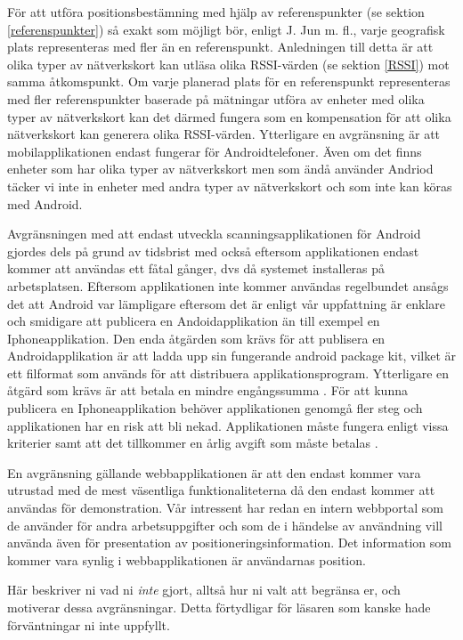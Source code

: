 \documentclass[swedish, a4paper,12pt]{article}
\begin{document}
För att utföra positionsbestämning med hjälp av referenspunkter (se sektion \ref{referenspunkter}) så exakt som möjligt bör, enligt J. Jun m. fl., varje geografisk plats representeras med fler än en referenspunkt\cite{jun2018low}.
Anledningen till detta är att olika typer av nätverkskort kan utläsa olika RSSI-värden (se sektion \ref{RSSI}) mot samma åtkomspunkt\cite{problem_with_RSSI}. Om varje planerad plats för en referenspunkt representeras med fler referenspunkter baserade på mätningar utföra av enheter med olika typer av nätverkskort kan det därmed fungera som en kompensation för att olika nätverkskort kan generera olika RSSI-värden\cite{jun2018low}.
Ytterligare en avgränsning är att mobilapplikationen endast fungerar för Androidtelefoner. Även om det finns enheter som har olika typer av nätverkskort men som ändå använder Andriod täcker vi inte in enheter med andra typer av nätverkskort och som inte kan köras med Android.

Avgränsningen med att endast utveckla scanningsapplikationen för Android gjordes dels på grund av tidsbrist med också eftersom applikationen endast kommer att användas ett fåtal gånger, dvs då systemet installeras på arbetsplatsen. Eftersom applikationen inte kommer användas regelbundet ansågs det att Android var lämpligare eftersom det är enligt vår uppfattning är enklare och smidigare att publicera en Andoidapplikation än till exempel en Iphoneapplikation. Den enda åtgärden som krävs för att publisera en Androidapplikation är att ladda upp sin fungerande android package kit, vilket är ett filformat som används för att distribuera applikationsprogram. Ytterligare en åtgärd som krävs är att betala en mindre engångssumma \cite{android} \cite{guidePublish}. För att kunna publicera en Iphoneapplikation behöver applikationen genomgå fler steg och applikationen har en risk att bli nekad. Applikationen måste fungera enligt vissa kriterier samt att det tillkommer en årlig avgift som måste betalas \cite{submitIphone} \cite{guidePublish}.

En avgränsning gällande webbapplikationen är att den endast kommer vara utrustad med de mest väsentliga funktionaliteterna då den endast kommer att användas för demonstration. Vår intressent har redan en intern webbportal som de använder för andra arbetsuppgifter och som de i händelse av användning vill använda även för presentation av positioneringsinformation. Det information som kommer vara synlig i webbapplikationen är användarnas position.

\iffalse Här beskriver ni vad ni \emph{inte} gjort, alltså hur ni valt att begränsa er, och motiverar dessa avgränsningar. Detta förtydligar för läsaren som kanske hade förväntningar ni inte uppfyllt.
\end{document}
